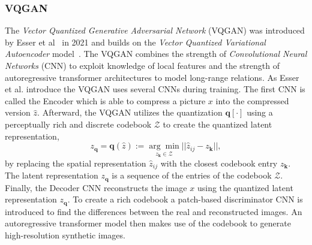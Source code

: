 \subsubsection{VQGAN}
The \emph{Vector Quantized Generative Adversarial Network} (VQGAN) was introduced by
Esser et al~\cite{esser2021tamingtransformershighresolutionimage} in 2021 and
builds on the \emph{Vector Quantized Variational Autoencoder}
model~\cite{vdOord2017NeuralDiscreteRepresentationLearning}. The VQGAN combines
the strength of \emph{Convolutional Neural Networks} (CNN) to exploit knowledge
of local features and the strength of autoregressive transformer architectures
to model long-range relations. As Esser et al. introduce the VQGAN uses several
CNNs during training. The first CNN is called the Encoder which is able to
compress a picture $x$ into the compressed version $\hat{z}$. Afterward,
the VQGAN utilizes the quantization $\boldsymbol{q}[\cdot]$ using a
perceptually rich and discrete codebook $\mathcal{Z}$ to create the quantized
latent representation,
\begin{equation}
    z_{\boldsymbol{q}} = \boldsymbol{q}(\hat{z}) :=\underset{z_{\boldsymbol{k}}\in\mathcal{Z}}{\arg\min}||\hat{z}_{ij} - z_{\boldsymbol{k}}||,
\end{equation}
by replacing the spatial representation $\hat{z}_{ij}$ with the closest
codebook entry $z_{\boldsymbol{k}}$. The latent representation
$z_{\boldsymbol{q}}$ is a sequence of the entries of the codebook $\mathcal{Z}$.
Finally, the Decoder CNN reconstructs the image $x$ using the quantized latent
representation $z_{\boldsymbol{q}}$. To create a rich codebook a patch-based
discriminator CNN is introduced to find the differences between the real and
reconstructed images. An autoregressive transformer model then makes use of the
codebook to generate high-resolution synthetic images.

